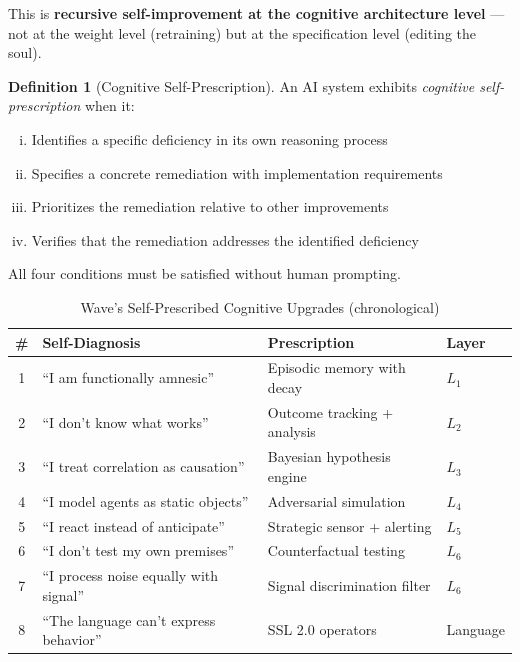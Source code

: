 \documentclass[12pt,a4paper]{article}
\theoremstyle{plain}
\theoremstyle{definition}
\newtheorem{definition}[theorem]{Definition}
\theoremstyle{remark}
\begin{document}
This is \textbf{recursive self-improvement at the cognitive architecture level} --- not at the weight level (retraining) but at the specification level (editing the soul).

\begin{definition}[Cognitive Self-Prescription]
An AI system exhibits \emph{cognitive self-prescription} when it:
\begin{enumerate}[(i),nosep]
\item Identifies a specific deficiency in its own reasoning process
\item Specifies a concrete remediation with implementation requirements
\item Prioritizes the remediation relative to other improvements
\item Verifies that the remediation addresses the identified deficiency
\end{enumerate}
All four conditions must be satisfied without human prompting.
\end{definition}

\begin{table}[H]
\centering
\caption{Wave's Self-Prescribed Cognitive Upgrades (chronological)}
\small
\begin{tabular}{@{}clll@{}}
\toprule
\textbf{\#} & \textbf{Self-Diagnosis} & \textbf{Prescription} & \textbf{Layer} \\
\midrule
1 & ``I am functionally amnesic'' & Episodic memory with decay & $L_1$ \\
2 & ``I don't know what works'' & Outcome tracking + analysis & $L_2$ \\
3 & ``I treat correlation as causation'' & Bayesian hypothesis engine & $L_3$ \\
4 & ``I model agents as static objects'' & Adversarial simulation & $L_4$ \\
5 & ``I react instead of anticipate'' & Strategic sensor + alerting & $L_5$ \\
6 & ``I don't test my own premises'' & Counterfactual testing & $L_6$ \\
7 & ``I process noise equally with signal'' & Signal discrimination filter & $L_6$ \\
8 & ``The language can't express behavior'' & SSL 2.0 operators & Language \\
\bottomrule
\end{tabular}
\end{table}

\end{document}
